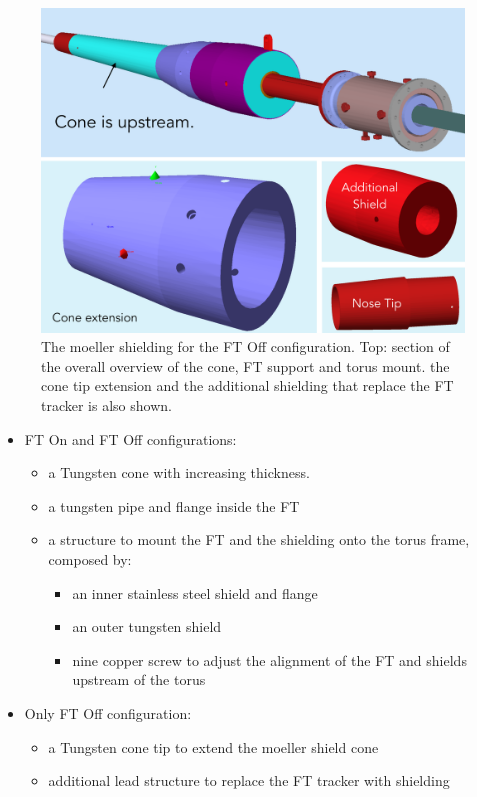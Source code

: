 \begin{figure}
	\centering
	\includegraphics[width=0.98\columnwidth,keepaspectratio]{img/moellerShieldingFTOff.png}
   \caption{The moeller shielding for the FT Off configuration. Top: section of the overall overview of the cone, FT support and torus mount.
            the cone tip extension and the additional shielding that replace the FT tracker is also shown.}
	\label{fig:moellerShieldingFTOff}
\end{figure}



\begin{itemize}
	\item FT On and FT Off configurations:
	\begin{itemize}
		\item a Tungsten cone with increasing thickness.
		\item a tungsten pipe and flange inside the FT
		\item a structure to mount the FT and the shielding onto the torus frame, composed by:
		\begin{itemize}
			\item an inner stainless steel shield and flange
			\item an outer tungsten shield
			\item nine copper screw to adjust the alignment of the FT and shields upstream of the torus
		\end{itemize}
	\end{itemize}
	\item Only FT Off configuration:
	\begin{itemize}
	\item a Tungsten cone tip to extend the moeller shield cone
	\item additional lead structure to replace the FT tracker with shielding
	\end{itemize}

\end{itemize}




